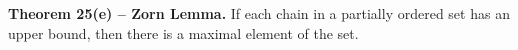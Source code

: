 \textbf{Theorem 25(e) -- Zorn Lemma.} If each chain in a partially ordered set has an upper bound, then there is a maximal element of the set.
